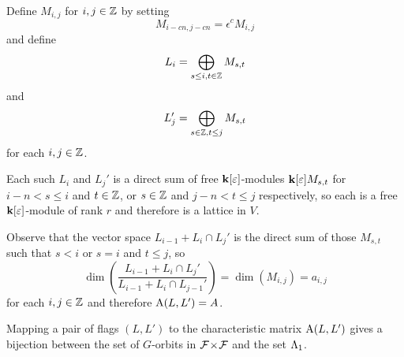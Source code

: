 \documentclass[a4paper, 11pt]{report}
\begin{document}
Define $M_{i,j}$ for $i,j\in\mathbb{Z}$ by setting
\begin{equation*}
M_{i-cn,j-cn} = \epsilon^c M_{i,j}
\end{equation*}
and define
\begin{equation*}
L_i = \bigoplus_{s\le i, t\in\mathbb{Z}} M_{s,t}
\end{equation*}
and
\begin{equation*}
L_j' = \bigoplus_{s\in\mathbb{Z}, t\le j} M_{s,t}
\end{equation*}
for each $i,j\in\mathbb{Z}$.

Each such $L_i$ and $L_j'$ is a direct sum of free $\mathbf{k}[\varepsilon]$-modules $\mathbf{k}[\varepsilon]M_{s,t}$ for $i-n<s\le i$ and $t\in\mathbb{Z}$, or $s\in\mathbb{Z}$ and $j-n<t\le j$ respectively, so each is a free $\mathbf{k}[\varepsilon]$-module of rank $r$ and therefore is a lattice in $V$.

Observe that the vector space $L_{i-1}+L_i\cap L_j'$ is the direct sum of those $M_{s,t}$ such that $s<i$ or $s=i$ and $t\le j$, so
\begin{equation*}
\dim\left(\frac{L_{i-1} + L_i\cap L_j'}{L_{i-1} + L_i\cap L_{j-1}'}\right) = \dim\left(M_{i,j}\right) = a_{i,j}
\end{equation*}
for each $i,j\in\mathbb{Z}$ and therefore $\operatorname{A}(L,L')=A$.

\begin{lemma}
Mapping a pair of flags $(L,L')$ to the characteristic matrix $\operatorname{A}(L,L')$ gives a bijection between the set of $G$-orbits in ${\mathcal{F}\!\times\!\mathcal{F}}$ and the set $\Lambda_1{}$.
\end{lemma}
\end{document}
